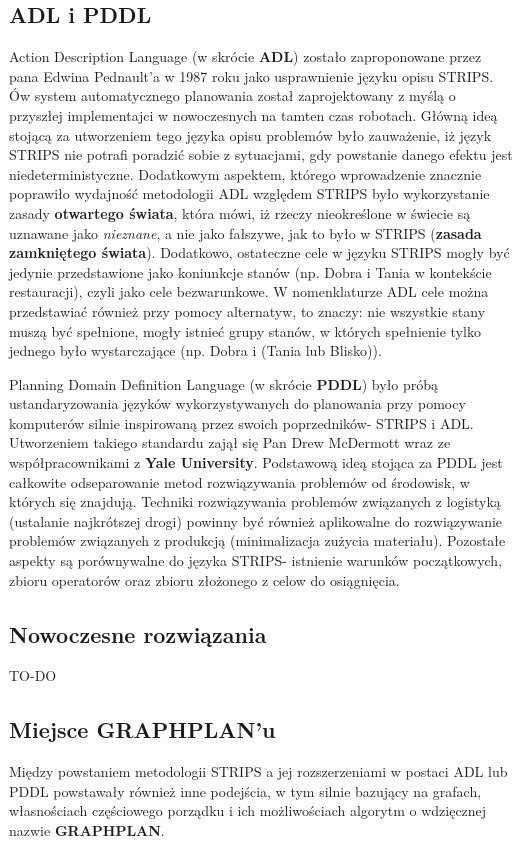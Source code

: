     \subsection{ADL i PDDL}
    Action Description Language (w skrócie \textbf{ADL}) zostało zaproponowane przez pana Edwina Pednault'a  w 1987 roku jako usprawnienie 
    języku opisu STRIPS. Ów system automatycznego planowania został zaprojektowany z myślą o przyszłej implementajci w nowoczesnych na tamten czas robotach.
    Główną ideą stojącą za utworzeniem tego języka opisu problemów było zauważenie, iż język STRIPS nie potrafi poradzić sobie z sytuacjami, gdy
    powstanie danego efektu jest niedeterministyczne. Dodatkowym aspektem, którego wprowadzenie znacznie poprawiło wydajność metodologii ADL względem STRIPS 
    było wykorzystanie zasady \textbf{otwartego świata}, która mówi, iż rzeczy nieokreślone w świecie są uznawane jako \textit{nieznane}, a nie jako 
    fałszywe, jak to było w STRIPS (\textbf{zasada zamkniętego świata}). Dodatkowo, ostateczne cele w języku STRIPS mogły być jedynie przedstawione jako 
    koniunkcje stanów (np. Dobra i Tania w kontekście restauracji), czyli jako cele bezwarunkowe. 
    W nomenklaturze ADL cele można przedstawiać również przy pomocy alternatyw, to znaczy: 
    nie wszystkie stany muszą być spełnione, mogły istnieć grupy stanów, w których spełnienie tylko jednego było wystarczające (np. Dobra i (Tania lub Blisko)). 

    Planning Domain Definition Language (w skrócie \textbf{PDDL}) było próbą ustandaryzowania języków wykorzystywanych 
    do planowania przy pomocy komputerów silnie inspirowaną przez swoich poprzedników- STRIPS i ADL. 
    Utworzeniem takiego standardu zajął się Pan Drew McDermott wraz ze współpracownikami z \textbf{Yale University}.
    Podstawową ideą stojąca za PDDL jest całkowite odseparowanie metod rozwiązywania problemów od środowisk, w których się 
    znajdują. Techniki rozwiązywania problemów związanych z logistyką (ustalanie najkrótszej drogi) powinny być również aplikowalne do rozwiązywanie problemów 
    związanych z produkcją (minimalizacja zużycia materiału). Pozostałe aspekty są porównywalne do języka STRIPS- 
    istnienie warunków początkowych, zbioru operatorów oraz zbioru złożonego z celow do osiągnięcia.



    \subsection{Nowoczesne rozwiązania}
    TO-DO
    
    \subsection{Miejsce GRAPHPLAN'u}
    Między powstaniem metodologii STRIPS a jej rozszerzeniami w postaci ADL lub PDDL powstawały również inne podejścia, w tym silnie 
    bazujący na grafach, własnościach częściowego porządku i ich możliwościach algorytm o wdzięcznej nazwie \textbf{GRAPHPLAN}.






